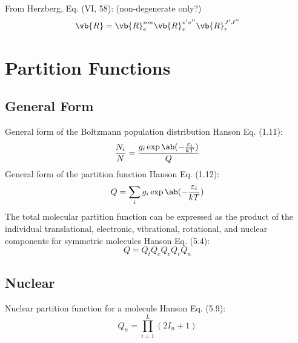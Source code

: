 \documentclass[11pt, twoside, fleqn]{report}
\begin{document}
From Herzberg, Eq. (VI, 58): (non-degenerate only?)
\begin{equation*}
    \vb{R} = \vb{R}_e^{nm}\vb{R}_v^{v'v''}\vb{R}_r^{J'J''}
\end{equation*}

\section{Partition Functions}

\subsection{General Form}

General form of the Boltzmann population distribution Hanson Eq. (1.11):
\begin{equation*}
    \frac{N_i}{N} = \frac{g_i\exp\ab(-\frac{\varepsilon_i}{kT})}{Q}
\end{equation*}
General form of the partition function Hanson Eq. (1.12):
\begin{equation*}
    Q = \sum_i g_i\exp\ab(-\frac{\varepsilon_i}{kT})
\end{equation*}
The total molecular partition function can be expressed as the product of the individual translational, electronic, vibrational, rotational, and nuclear components for symmetric molecules Hanson Eq. (5.4):
\begin{equation*}
    Q = Q_tQ_eQ_vQ_rQ_n
\end{equation*}

\subsection{Nuclear}

Nuclear partition function for a molecule Hanson Eq. (5.9):
\begin{equation*}
    Q_n = \prod_{i = 1}^L (2I_n + 1)
\end{equation*}
\end{document}
